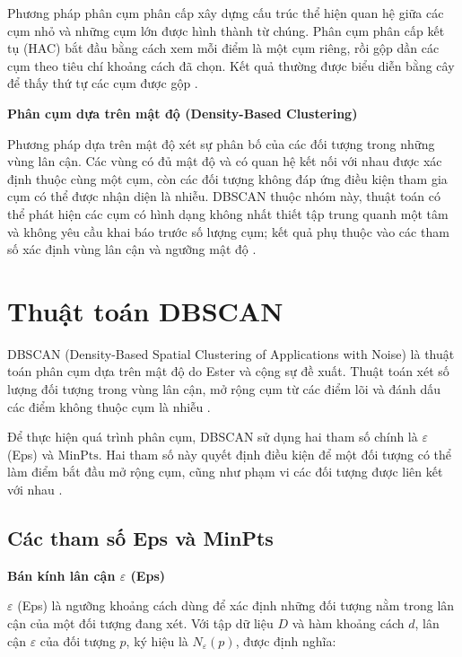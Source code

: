 Phương pháp phân cụm phân cấp xây dựng cấu trúc thể hiện quan hệ giữa các cụm nhỏ và những cụm lớn được hình thành từ chúng. Phân cụm phân cấp kết tụ (HAC) bắt đầu bằng cách xem mỗi điểm là một cụm riêng, rồi gộp dần các cụm theo tiêu chí khoảng cách đã chọn. Kết quả thường được biểu diễn bằng cây để thấy thứ tự các cụm được gộp \parencite{sklearnClusteringGuide}.

\textbf{Phân cụm dựa trên mật độ (Density-Based Clustering)}

Phương pháp dựa trên mật độ xét sự phân bố của các đối tượng trong những vùng lân cận. Các vùng có đủ mật độ và có quan hệ kết nối với nhau được xác định thuộc cùng một cụm, còn các đối tượng không đáp ứng điều kiện tham gia cụm có thể được nhận diện là nhiễu. DBSCAN thuộc nhóm này, thuật toán có thể phát hiện các cụm có hình dạng không nhất thiết tập trung quanh một tâm và không yêu cầu khai báo trước số lượng cụm; kết quả phụ thuộc vào các tham số xác định vùng lân cận và ngưỡng mật độ \parencite{ester1996dbscan}.

\section{Thuật toán DBSCAN}

DBSCAN (Density-Based Spatial Clustering of Applications with Noise) là thuật toán phân cụm dựa trên mật độ do Ester và cộng sự đề xuất. Thuật toán xét số lượng đối tượng trong vùng lân cận, mở rộng cụm từ các điểm lõi và đánh dấu các điểm không thuộc cụm là nhiễu \parencite{ester1996dbscan}.

Để thực hiện quá trình phân cụm, DBSCAN sử dụng hai tham số chính là \(\varepsilon\) (Eps) và \(\mathrm{MinPts}\). Hai tham số này quyết định điều kiện để một đối tượng có thể làm điểm bắt đầu mở rộng cụm, cũng như phạm vi các đối tượng được liên kết với nhau \parencite{ester1996dbscan}.

\subsection{Các tham số Eps và MinPts}

\textbf{Bán kính lân cận \(\varepsilon\) (Eps)}

\(\varepsilon\) (Eps) là ngưỡng khoảng cách dùng để xác định những đối tượng nằm trong lân cận của một đối tượng đang xét. Với tập dữ liệu \(D\) và hàm khoảng cách \(d\), lân cận \(\varepsilon\) của đối tượng \(p\), ký hiệu là \(N_{\varepsilon}(p)\), được định nghĩa:

